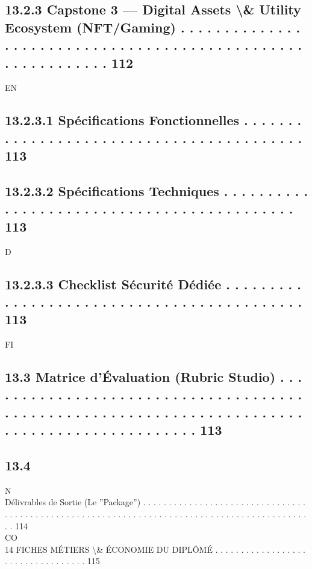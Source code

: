 \documentclass[12pt,landscape,a4paper]{article}
\begin{document}
\subsection{13.2.3    Capstone 3 — Digital Assets \textbackslash{}& Utility Ecosystem (NFT/Gaming) . . . . . . . . . . . . . . . . . . . . . . . . . . . . . . . . . . . . . . . . . . . . . . . . . . . . . . . . . . . . 112}
\vspace{0.5em}
\vspace{0.5em}
\vspace{0.5em}
\vspace{0.5em}
EN\\
\subsection{13.2.3.1 Spécifications Fonctionnelles . . . . . . . . . . . . . . . . . . . . . . . . . . . . . . . . . . . . . . . . . 113}
\subsection{13.2.3.2 Spécifications Techniques . . . . . . . . . . . . . . . . . . . . . . . . . . . . . . . . . . . . . . . . . . . 113}
\vspace{0.5em}
\vspace{0.5em}
\vspace{0.5em}
\vspace{0.5em}
D\\
\subsection{13.2.3.3 Checklist Sécurité Dédiée . . . . . . . . . . . . . . . . . . . . . . . . . . . . . . . . . . . . . . . . . . . 113}
\vspace{0.5em}
\vspace{0.5em}
\vspace{0.5em}
\vspace{0.5em}
FI\\
\subsection{13.3    Matrice d’Évaluation (Rubric Studio) . . . . . . . . . . . . . . . . . . . . . . . . . . . . . . . . . . . . . . . . . . . . . . . . . . . . . . . . . . . . . . . . . . . . . . . . . . . . . . . . . . . . . . . . . . . . . 113}
\subsection{13.4}
N\\
Délivrables de Sortie (Le ”Package”) . . . . . . . . . . . . . . . . . . . . . . . . . . . . . . . . . . . . . . . . . . . . . . . . . . . . . . . . . . . . . . . . . . . . . . . . . . . . . . . . . . . . . . . . . . . . . 114\\
CO\\
14    FICHES MÉTIERS \textbackslash{}& ÉCONOMIE DU DIPLÔMÉ . . . . . . . . . . . . . . . . . . . . . . . . . . . . . . . . . . 115\\
\end{document}
